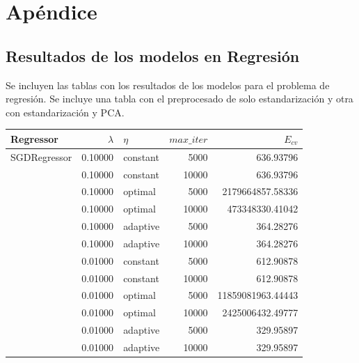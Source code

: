 \documentclass[a4paper, 20pt]{article}
\begin{document}
\section{Apéndice}

\subsection{Resultados de los modelos en Regresión}
\label{apend:regresion}

Se incluyen las tablas con los resultados de los modelos para el problema de regresión. Se incluye una tabla con el preprocesado de solo estandarización y otra con estandarización y PCA.

\begin{table}[H]
  \centering
\begin{tabular}{lrlrr}
Regressor                        & $\lambda$ & $\eta$   & $max\_iter$ & $E_{cv}$                \\ \hline
SGDRegressor                     & 0.10000   & constant & 5000        & 636.93796          \\
                                 & 0.10000   & constant & 10000       & 636.93796          \\
                                 & 0.10000   & optimal  & 5000        & 2179664857.58336   \\
                                 & 0.10000   & optimal  & 10000       & 473348330.41042    \\
                                 & 0.10000   & adaptive & 5000        & 364.28276          \\
                                 & 0.10000   & adaptive & 10000       & 364.28276          \\
                                 & 0.01000   & constant & 5000        & 612.90878          \\
                                 & 0.01000   & constant & 10000       & 612.90878          \\
                                 & 0.01000   & optimal  & 5000        & 11859081963.44443  \\
                                 & 0.01000   & optimal  & 10000       & 2425006432.49777   \\
                                 & 0.01000   & adaptive & 5000        & 329.95897          \\
                                 & 0.01000   & adaptive & 10000       & 329.95897          \\

\end{tabular}
\end{table}
\end{document}
